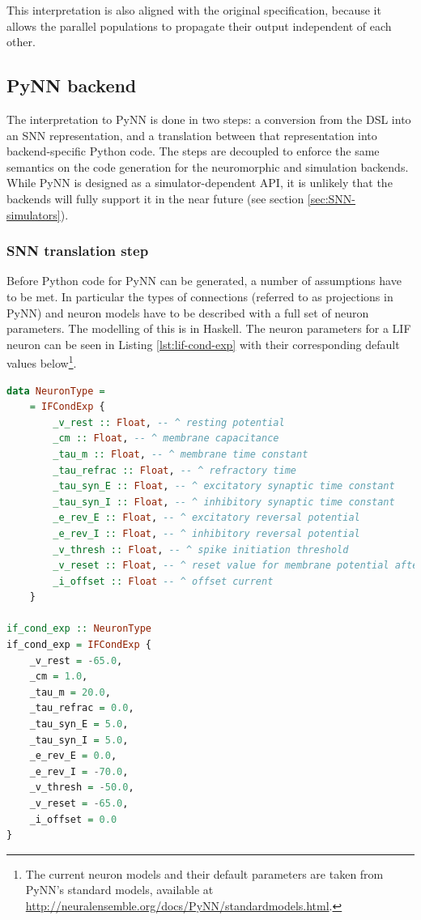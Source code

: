 This interpretation is also aligned with the original specification, 
because it allows the parallel populations to propagate their output
independent of each other.

\subsection{PyNN backend}
The interpretation to PyNN is done in two steps: a
conversion from the \gls{DSL} into an \gls{SNN} representation,
and a translation between that representation into backend-specific
Python code.
The steps are decoupled to enforce the same semantics on the code
generation for the neuromorphic and simulation backends.
While PyNN is designed as a simulator-dependent \gls{API}, 
it is unlikely that the backends will fully support it in the
near future (see section \ref{sec:SNN-simulators}).

\subsubsection{\gls{SNN} translation step}
Before Python code for PyNN can be generated, a number of assumptions
have to be met. 
In particular the types of connections (referred to as projections in PyNN)
and neuron models have to be described with a full set of neuron parameters.
The modelling of this is in Haskell.
The neuron parameters for a LIF neuron can be seen in Listing
\ref{lst:lif-cond-exp} with their corresponding default values
below\footnote{
The current neuron models and their default parameters are taken from PyNN's
standard models, available at
\url{http://neuralensemble.org/docs/PyNN/standardmodels.html}.
}.

\begin{lstlisting}[language=Haskell,caption={A LIF neuron with exponential decay and
  conductance-based synapses, modelled in Haskell.},label={lst:lif-cond-exp}]
data NeuronType =
    = IFCondExp {
        _v_rest :: Float, -- ^ resting potential
        _cm :: Float, -- ^ membrane capacitance
        _tau_m :: Float, -- ^ membrane time constant
        _tau_refrac :: Float, -- ^ refractory time
        _tau_syn_E :: Float, -- ^ excitatory synaptic time constant
        _tau_syn_I :: Float, -- ^ inhibitory synaptic time constant
        _e_rev_E :: Float, -- ^ excitatory reversal potential
        _e_rev_I :: Float, -- ^ inhibitory reversal potential
        _v_thresh :: Float, -- ^ spike initiation threshold
        _v_reset :: Float, -- ^ reset value for membrane potential after a spike
        _i_offset :: Float -- ^ offset current
    }

if_cond_exp :: NeuronType
if_cond_exp = IFCondExp {
    _v_rest = -65.0,
    _cm = 1.0,
    _tau_m = 20.0,
    _tau_refrac = 0.0,
    _tau_syn_E = 5.0,
    _tau_syn_I = 5.0,
    _e_rev_E = 0.0,
    _e_rev_I = -70.0,
    _v_thresh = -50.0,
    _v_reset = -65.0,
    _i_offset = 0.0
}
\end{lstlisting}

